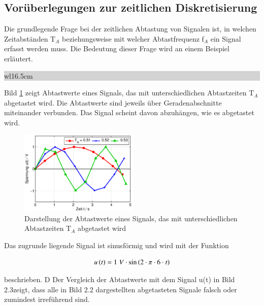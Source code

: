 \clearpage


\subsection{Vorüberlegungen zur zeitlichen Diskretisierung}

\noindent Die grundlegende Frage bei der zeitlichen Abtastung von Signalen ist, in welchen Zeitabständen T$_{A}$ beziehungsweise mit welcher Abtastfrequenz f$_{A}$ ein Signal erfasst werden muss. Die Bedeutung dieser Frage wird an einem Beispiel erläutert. \bigskip

\noindent
\colorbox{lightgray}{%
%
\renewcommand\arraystretch{0.6}%
\begin{tabular}{ wl{16.5cm} }
{\selectfont{Beispiel: Abtastwerte} }
\end{tabular}%
}\bigskip

\noindent Bild \ref{fig:AbtastwerteUnterschiedlicheAbtastzeiten} zeigt Abtastwerte eines Signals, das mit unterschiedlichen Abtastzeiten T$_{A}$ abgetastet wird. Die Abtastwerte sind jeweils über Geradenabschnitte miteinander verbunden. Das Signal scheint davon abzuhängen, wie es abgetastet wird.

\begin{figure}[H]
  \centerline{\includegraphics[width=0.5\textwidth]{Kapitel1/Bilder/image2}}
  \caption{Darstellung der Abtastwerte eines Signals, das mit unterschiedlichen Abtastzeiten T$_{A}$ abgetastet wird}
  \label{fig:AbtastwerteUnterschiedlicheAbtastzeiten}
\end{figure}


\noindent Das zugrunde liegende Signal ist sinusförmig und wird mit der Funktion

\begin{equation}\label{eq:twotwo}
u\left(t\right)=1{\rm \; }V\cdot \sin \left(2\cdot \pi \cdot 6\cdot t\right)
\end{equation}

\noindent beschrieben. D Der Vergleich der Abtastwerte mit dem Signal u(t) in Bild 2.3zeigt, dass alle in Bild 2.2 dargestellten abgetasteten Signale falsch oder zumindest irreführend sind.

